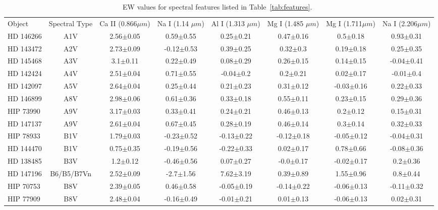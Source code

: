 \begin{table}
\begin{center}
\caption{EW values for spectral features listed in Table~\ref{tab:features}.~\label{tab:EWvals}}
\begin{tabular}{l|c|c|c|c|c|c|c}
Object & Spectral Type & Ca II (0.866$\mu m$) & Na I (1.14 $\mu m$) & Al I (1.313 $\mu m$) & Mg I (1.485 $\mu m$) & Mg I (1.711$\mu m$) & Na I (2.206$\mu m$) \\
HD 146266 & A1V & 2.56$\pm$0.05 & 0.59$\pm$0.55 & 0.25$\pm$0.21 & 0.47$\pm$0.16 & 0.5$\pm$0.18 & 0.93$\pm$0.31 \\
HD 143472 & A2V & 2.73$\pm$0.09 & -0.12$\pm$0.53 & 0.39$\pm$0.25 & 0.32$\pm$0.3 & 0.19$\pm$0.18 & 0.25$\pm$0.35 \\
HD 145468 & A3V & 3.1$\pm$0.11 & 0.22$\pm$0.49 & 0.08$\pm$0.29 & 0.26$\pm$0.15 & 0.14$\pm$0.15 & -0.04$\pm$0.41 \\
HD 142424 & A4V & 2.51$\pm$0.04 & 0.71$\pm$0.55 & -0.04$\pm$0.2 & 0.2$\pm$0.21 & 0.02$\pm$0.17 & -0.01$\pm$0.4 \\
HD 142097 & A5V & 2.64$\pm$0.04 & 0.25$\pm$0.44 & 0.21$\pm$0.23 & 0.31$\pm$0.12 & -0.03$\pm$0.16 & 0.22$\pm$0.33 \\
HD 146899 & A8V & 2.98$\pm$0.06 & 0.61$\pm$0.36 & 0.33$\pm$0.18 & 0.55$\pm$0.11 & 0.23$\pm$0.15 & 0.29$\pm$0.36 \\
HIP 73990 & A9V & 3.17$\pm$0.03 & 0.33$\pm$0.41 & 0.24$\pm$0.21 & 0.46$\pm$0.13 & 0.2$\pm$0.12 & 0.15$\pm$0.31 \\
HD 147137 & A9V & 2.61$\pm$0.04 & 0.67$\pm$0.45 & 0.28$\pm$0.19 & 0.46$\pm$0.14 & 0.3$\pm$0.14 & 0.32$\pm$0.33 \\
HIP 78933 & B1V & 1.79$\pm$0.03 & -0.23$\pm$0.52 & -0.13$\pm$0.22 & -0.12$\pm$0.18 & -0.05$\pm$0.12 & -0.04$\pm$0.31 \\
HD 144470 & B1V & 0.75$\pm$0.35 & -0.19$\pm$0.56 & -0.22$\pm$0.33 & 0.02$\pm$0.17 & 0.78$\pm$0.66 & -0.08$\pm$0.36 \\
HD 138485 & B3V & 1.2$\pm$0.12 & -0.46$\pm$0.56 & 0.07$\pm$0.27 & -0.0$\pm$0.17 & -0.02$\pm$0.17 & 0.2$\pm$0.36 \\
HD 147196 & B6/B5/B7Vn & 2.52$\pm$0.09 & -2.7$\pm$1.56 & 7.62$\pm$3.19 & 0.39$\pm$0.89 & 1.55$\pm$0.96 & 0.8$\pm$0.44 \\
HIP 70753 & B8V & 2.39$\pm$0.05 & 0.46$\pm$0.58 & -0.05$\pm$0.19 & -0.14$\pm$0.22 & -0.06$\pm$0.13 & -0.11$\pm$0.32 \\
HIP 77909 & B8V & 2.48$\pm$0.04 & -0.16$\pm$0.49 & -0.01$\pm$0.21 & 0.01$\pm$0.13 & -0.06$\pm$0.13 & 0.02$\pm$0.31 \\

\end{tabular}
\end{center}
\end{table}
